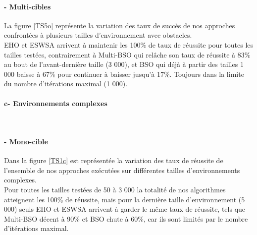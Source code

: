 	\noindent
	\begin{minipage}[t]{0.50\textwidth}
		\paragraph{- Multi-cibles}
		\textbf{}
		
		La figure \ref{TS5o} représente la variation des taux de succès de nos approches confrontées à plusieurs tailles d'environnement avec obstacles.\\
		
		EHO et ESWSA arrivent à maintenir les 100\% de taux de réussite pour toutes les tailles testées, contrairement à Multi-BSO qui relâche son taux de réussite à 83\% au bout de l'avant-dernière taille (3 000), et BSO qui déjà à partir des tailles 1 000 baisse à 67\% pour continuer à baisser jusqu'à 17\%. Toujours dans la limite du nombre d'itérations maximal (1 000).
		
	\end{minipage}\hfill
	\begin{minipage}[t]{0.55\textwidth}
		\captionsetup{width=0.8\linewidth}
		\centering{}
		\label{TS5o}
	\end{minipage}\hfill
	
	\textbf{ }
	\paragraph{c- Environnements complexes}
	\textbf{}\\
	\noindent
	\begin{minipage}[t]{0.5\textwidth}
		\paragraph{- Mono-cible}
		\textbf{}
		
		Dans la figure \ref{TS1c} est représentée la variation des taux de réussite de l'ensemble de nos approches exécutées sur différentes tailles d'environnements complexes.\\
		
		Pour toutes les tailles testées de 50 à 3 000 la totalité de nos algorithmes atteignent les 100\% de réussite, mais pour la dernière taille d'environnement (5 000) seuls EHO et ESWSA arrivent à garder le même taux de réussite, tels que Multi-BSO décent à 90\% et BSO chute à 60\%, car ils sont limités par le nombre d'itérations maximal.
		
	\end{minipage}\hfill
	\begin{minipage}[t]{0.55\textwidth}
		\captionsetup{width=0.8\linewidth}
		\centering{}
		\label{TS1c}
	\end{minipage}\hfill
	
